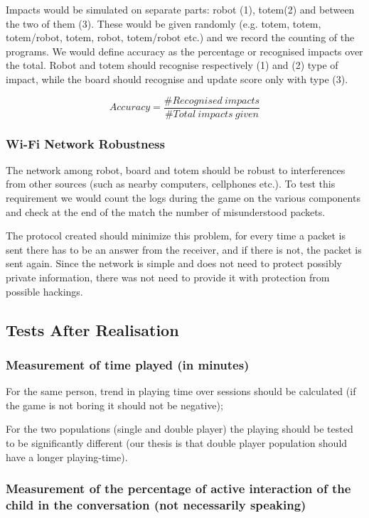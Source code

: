 \documentclass[a4paper,twoside]{book}
\begin{document}
Impacts would be simulated on separate parts: robot (1), totem(2) and between the two of them (3). These would be given randomly (e.g. totem, totem, totem/robot, totem, robot, totem/robot etc.) and we record the counting of the programs. We would define accuracy as the percentage or recognised impacts over the total. Robot and totem should recognise respectively (1) and (2) type of impact, while the board should recognise and update score only with type (3).

\[Accuracy=\frac{\#Recognised\ impacts}{\#Total\ impacts\ given}\]

\subsubsection*{Wi-Fi Network Robustness}

The network among robot, board and totem should be robust to interferences from other sources (such as nearby computers, cellphones etc.). To test this requirement we would count the logs during the game on the various components and check at the end of the match the number of misunderstood packets. 

The protocol created should minimize this problem, for every time a packet is sent there has to be an answer from the receiver, and if there is not, the packet is sent again. Since the network is simple and does not need to protect possibly private information, there was not need to provide it with protection from possible hackings.

\subsection{Tests After Realisation}

\subsubsection*{Measurement of time played (in minutes)}

For the same person, trend in playing time over sessions should be calculated (if the game is not boring it should not be negative);

For the two populations (single and double player) the playing should be tested to be significantly different (our thesis is that double player population should have a longer playing-time).

\subsubsection*{Measurement of the percentage of active interaction of the child in the conversation (not necessarily speaking)}
\end{document}

